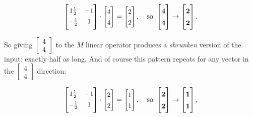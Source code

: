 \vspace{-.2in}
\begin{align*}
\renewcommand*{\arraystretch}{1.4}
\small
\begin{bmatrix}
1\frac{1}{2} & -1 \\
\smallskip
-\frac{1}{2} & 1 \\
\end{bmatrix} \cdot
\begin{bmatrix}
4 \\ 4 \\
\end{bmatrix} =
\begin{bmatrix}
2 \\ 2 \\
\end{bmatrix}, \normalsize \quad \textrm{so}\
\boldmath
\begin{bmatrix}
4 \\ 4 \\
\end{bmatrix} \rightarrow
\begin{bmatrix}
2 \\ 2 \\
\end{bmatrix}.
\unboldmath
\end{align*}

So giving {\footnotesize $\begin{bmatrix} 4 \\ 4 \end{bmatrix}$} to the $M$
linear operator produces a \textit{shrunken} version of the input: exactly half
as long. And of course this pattern repeats for any vector in the
{\footnotesize $\begin{bmatrix} 4 \\ 4 \end{bmatrix}$} direction:

\vspace{-.2in}
\begin{align*}
\renewcommand*{\arraystretch}{1.4}
\small
\begin{bmatrix}
1\frac{1}{2} & -1 \\
\smallskip
-\frac{1}{2} & 1 \\
\end{bmatrix} \cdot
\begin{bmatrix}
2 \\ 2 \\
\end{bmatrix} =
\begin{bmatrix}
1 \\ 1 \\
\end{bmatrix}, \normalsize \quad \textrm{so}\
\boldmath
\begin{bmatrix}
2 \\ 2 \\
\end{bmatrix} \rightarrow
\begin{bmatrix}
1 \\ 1 \\
\end{bmatrix},
\unboldmath
\end{align*}

